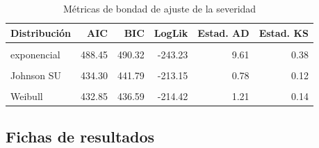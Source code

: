 \documentclass[
  letterpaper,
  onepage,
  openany]{scrreprt}
\begin{document}
\hypertarget{tbl-metricasSeveridad}{}
\begin{table}
\caption{\label{tbl-metricasSeveridad}Métricas de bondad de ajuste de la severidad }\tabularnewline

\centering
\begin{tabular}[t]{l|r|r|r|r|r}
\hline
\textbf{Distribución} & \textbf{AIC} & \textbf{BIC} & \textbf{LogLik} & \textbf{Estad. AD} & \textbf{Estad. KS}\\
\hline
\cellcolor{gray!6}{log-normal} & \cellcolor{gray!6}{455.50} & \cellcolor{gray!6}{459.24} & \cellcolor{gray!6}{-225.75} & \cellcolor{gray!6}{3.57} & \cellcolor{gray!6}{0.24}\\
\hline
exponencial & 488.45 & 490.32 & -243.23 & 9.61 & 0.38\\
\hline
\cellcolor{gray!6}{gamma} & \cellcolor{gray!6}{443.14} & \cellcolor{gray!6}{446.88} & \cellcolor{gray!6}{-219.57} & \cellcolor{gray!6}{2.44} & \cellcolor{gray!6}{0.20}\\
\hline
Johnson SU & 434.30 & 441.79 & -213.15 & 0.78 & 0.12\\
\hline
\cellcolor{gray!6}{glogis} & \cellcolor{gray!6}{427.78} & \cellcolor{gray!6}{433.39} & \cellcolor{gray!6}{-210.89} & \cellcolor{gray!6}{0.28} & \cellcolor{gray!6}{0.07}\\
\hline
Weibull & 432.85 & 436.59 & -214.42 & 1.21 & 0.14\\
\hline
\end{tabular}
\end{table}

\newpage

\hypertarget{fichas-de-resultados}{%
\subsection{Fichas de resultados}\label{fichas-de-resultados}}
\end{document}

